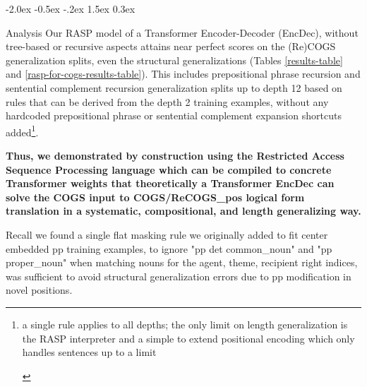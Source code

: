 \documentclass[11pt]{article}
\makeatletter
\renewcommand\section{\@startsection{section}{1}{\z@}%
                                  {-2.0ex \@plus -0.5ex \@minus -.2ex}%
                                  {1.5ex \@plus 0.3ex}%
                                  {\large\bfseries\raggedright}}
\makeatother
\begin{document}
\section{Analysis} 
Our RASP model of a Transformer Encoder-Decoder (EncDec), without tree-based or recursive aspects attains near perfect scores on the (Re)COGS generalization splits, even the structural generalizations (Tables \ref{results-table} and \ref{rasp-for-cogs-results-table}). This includes prepositional phrase recursion and sentential complement recursion generalization splits up to depth 12 based on rules that can be derived from the depth 2 training examples, without any hardcoded prepositional phrase or sentential complement expansion shortcuts added\footnote{\begin{footnotesize}a single rule applies to all depths; the only limit on length generalization is the RASP interpreter and a simple to extend positional encoding which only handles sentences up to a limit\end{footnotesize}}. 

\textbf{Thus, we demonstrated by construction using the Restricted Access Sequence Processing language which can be compiled to concrete Transformer weights that theoretically a Transformer EncDec can solve the COGS input to COGS/ReCOGS\_pos logical form translation in a systematic, compositional, and length generalizing way.}

Recall we found a single flat masking rule we originally added to fit center embedded pp training examples, to ignore "pp det common\_noun" and "pp proper\_noun" when matching nouns for the agent, theme, recipient right indices, was sufficient to avoid structural generalization errors due to pp modification in novel positions. 
\end{document}
